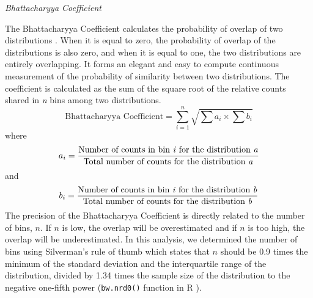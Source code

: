 \documentclass[12pt,letterpaper]{article}
\renewcommand{\subsection}[1]{%
\bigskip
\begin{center}
\begin{large}
\normalfont\itshape #1
\end{large}
\end{center}}
\begin{document}
\subsection{Bhattacharyya Coefficient}
The Bhattacharyya Coefficient calculates the probability of overlap of two distributions \cite{Bhattacharyya}. When it is equal to zero, the probability of overlap of the distributions is also zero, and when it is equal to one, the two distributions are entirely overlapping. It forms an elegant and easy to compute continuous measurement of the probability of similarity between two distributions. The coefficient is calculated as the sum of the square root of the relative counts shared in \textit{n} bins among two distributions.
\begin{equation}
\text{Bhattacharyya Coefficient}=\sum_{i=1}^{n} \sqrt{{\sum{a_i}}\times{\sum{b_i}}}
\end{equation}
where
\begin{equation}
{a_i}=\frac{\text{Number of counts in bin \textit{i} for the distribution \textit{a}}}{\text{Total number of counts for the distribution \textit{a}}}
\end{equation}
and
\begin{equation}
{b_i}=\frac{\text{Number of counts in bin \textit{i} for the distribution \textit{b}}}{\text{Total number of counts for the distribution \textit{b}}}
\end{equation}
The precision of the Bhattacharyya Coefficient is directly related to the number of bins, $n$. If $n$ is low, the overlap will be overestimated and if $n$ is too high, the overlap will be underestimated. In this analysis, we determined the number of bins using Silverman's rule of thumb which states that $n$ should be 0.9 times the minimum of the standard deviation and the interquartile range of the distribution, divided by 1.34 times the sample size of the distribution to the negative one-fifth power (\texttt{bw.nrd0()} function in R \cite{silverman1986density}).




\end{document}
